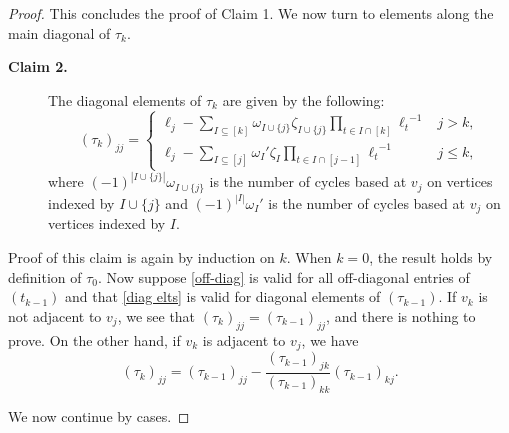 \documentclass{article}
\theoremstyle{definition}
\numberwithin{equation}{section}
\begin{document}
\begin{proof}
This concludes the proof of Claim 1.  We now turn to elements along the main diagonal of $\tau_k$.

\begin{description}
\item [{\bf Claim 2.}] The diagonal elements of $\tau_k$ are given by the following:
\begin{equation}\label{diag elts}
(\tau_k)_{jj}=\begin{cases}\ell_j-\sum_{I\subseteq [k]}\omega_{I\cup\{j\}}\zeta_{I\cup\{j\}}\prod_{t\in I\cap[k]}{\ell_t}^{-1}&j>k,\\
\ell_j-\sum_{I\subseteq [j]}{\omega_I}'\zeta_I\prod_{t\in I\cap[j-1]}{\ell_t}^{-1}&j\le k,
\end{cases}
\end{equation} where $(-1)^{|I\cup\{j\}|}\omega_{I\cup\{j\}}$ is the number of cycles based at $v_j$ on vertices indexed by $I\cup\{j\}$ and $(-1)^{|I|}{\omega_I}'$ is the number of cycles based at $v_j$ on vertices indexed by $I$.  
\end{description}

Proof of this claim is again by induction on $k$.  When $k=0$, the result holds by definition of $\tau_0$.  Now suppose \eqref{off-diag} is valid for all off-diagonal entries of $(t_{k-1})$ and that \eqref{diag elts} is valid for diagonal elements of $(\tau_{k-1})$.   If $v_k$ is not adjacent to $v_j$, we see that $(\tau_k)_{jj}=(\tau_{k-1})_{jj}$, and there is nothing to prove.  On the other hand, if $v_k$ is adjacent to $v_j$, we have 
\begin{equation}\label{diagonal recurrence}
(\tau_k)_{jj}=(\tau_{k-1})_{jj}-\frac{(\tau_{k-1})_{jk}}{(\tau_{k-1})_{kk}}(\tau_{k-1})_{kj}.
\end{equation}  

We now continue by cases.


\end{proof}
\end{document}
